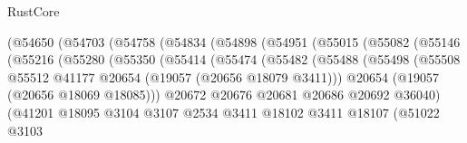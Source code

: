 \begin{lexlean}{RustCore}
\begin{coremodule}
                              (@54650
                                (@54703
                                  (@54758
                                    (@54834
                                      (@54898
                                        (@54951
                                          (@55015
                                            (@55082
                                              (@55146
                                                (@55216
                                                  (@55280
                                                    (@55350
                                                      (@55414
                                                        (@55474
                                                          (@55482
                                                            (@55488
                                                              (@55498
                                                                (@55508
                                                                  @55512
                                                                  @41177
                                                                  @20654
                                                                  (@19057 (@20656 @18079 @3411)))
                                                                @20654
                                                                (@19057 (@20656 @18069 @18085)))
                                                              @20672
                                                              @20676
                                                              @20681
                                                              @20686
                                                              @20692
                                                              @36040)
                                                            (@41201
                                                              @18095
                                                              @3104
                                                              @3107
                                                              @2534
                                                              @3411
                                                              @18102
                                                              @3411
                                                              @18107
                                                              (@51022
                                                                @3103

\end{coremodule}
\end{lexlean}
